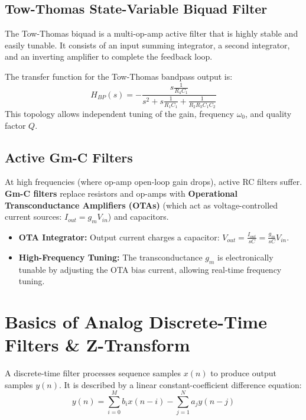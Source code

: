\documentclass[12pt,a4paper]{article}
\begin{document}
\subsection{Tow-Thomas State-Variable Biquad Filter}
The Tow-Thomas biquad is a multi-op-amp active filter that is highly stable and easily tunable. It consists of an input summing integrator, a second integrator, and an inverting amplifier to complete the feedback loop.

The transfer function for the Tow-Thomas bandpass output is:
\[
H_{BP}(s) = -\frac{s \frac{1}{R_4 C_1}}{s^2 + s \frac{1}{R_1 C_1} + \frac{1}{R_2 R_3 C_1 C_2}}
\]
This topology allows independent tuning of the gain, frequency $\omega_0$, and quality factor $Q$.

\subsection{Active Gm-C Filters}
At high frequencies (where op-amp open-loop gain drops), active RC filters suffer. \textbf{Gm-C filters} replace resistors and op-amps with \textbf{Operational Transconductance Amplifiers (OTAs)} (which act as voltage-controlled current sources: $I_{out} = g_m V_{in}$) and capacitors.
\begin{itemize}[leftmargin=*, itemsep=2pt]
  \item \textbf{OTA Integrator:} Output current charges a capacitor: $V_{out} = \frac{I_{out}}{sC} = \frac{g_m}{sC} V_{in}$.
  \item \textbf{High-Frequency Tuning:} The transconductance $g_m$ is electronically tunable by adjusting the OTA bias current, allowing real-time frequency tuning.
\end{itemize}

\section{Basics of Analog Discrete-Time Filters \& Z-Transform}

\begin{tcolorbox}[defbox, title={\textbf{Discrete-Time Filter Definition}}]
A discrete-time filter processes sequence samples $x(n)$ to produce output samples $y(n)$. It is described by a linear constant-coefficient difference equation:
\[
y(n) = \sum_{i=0}^{M} b_i x(n-i) - \sum_{j=1}^{N} a_j y(n-j)
\]
\end{tcolorbox}
\end{document}
